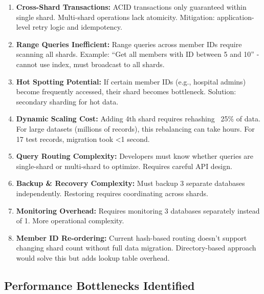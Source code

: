 \documentclass[12pt,a4paper]{article}
\begin{document}
\begin{enumerate}
    \item \textbf{Cross-Shard Transactions:} ACID transactions only guaranteed within single shard. Multi-shard operations lack atomicity. Mitigation: application-level retry logic and idempotency.
    
    \item \textbf{Range Queries Inefficient:} Range queries across member IDs require scanning all shards. Example: ``Get all members with ID between 5 and 10'' - cannot use index, must broadcast to all shards.
    
    \item \textbf{Hot Spotting Potential:} If certain member IDs (e.g., hospital admins) become frequently accessed, their shard becomes bottleneck. Solution: secondary sharding for hot data.
    
    \item \textbf{Dynamic Scaling Cost:} Adding 4th shard requires rehashing ~25\% of data. For large datasets (millions of records), this rebalancing can take hours. For 17 test records, migration took <1 second.
    
    \item \textbf{Query Routing Complexity:} Developers must know whether queries are single-shard or multi-shard to optimize. Requires careful API design.
    
    \item \textbf{Backup \& Recovery Complexity:} Must backup 3 separate databases independently. Restoring requires coordinating across shards.
    
    \item \textbf{Monitoring Overhead:} Requires monitoring 3 databases separately instead of 1. More operational complexity.
    
    \item \textbf{Member ID Re-ordering:} Current hash-based routing doesn't support changing shard count without full data migration. Directory-based approach would solve this but adds lookup table overhead.
\end{enumerate}

\subsection{Performance Bottlenecks Identified}
\end{document}
